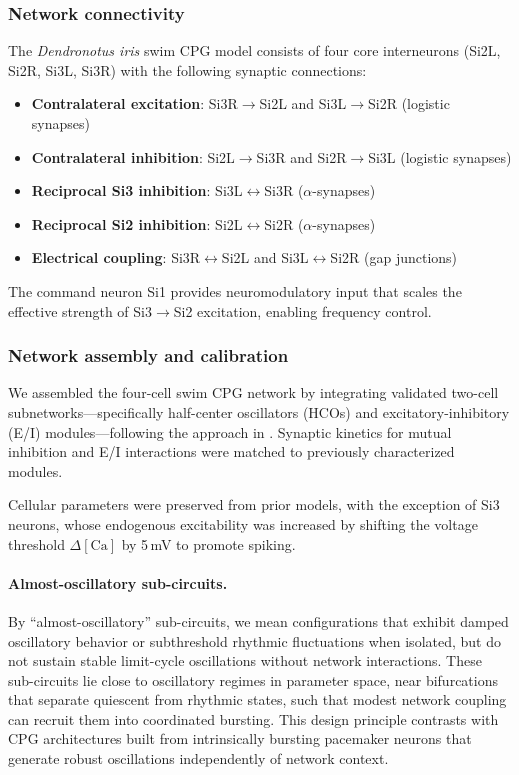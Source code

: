 \subsubsection*{Network connectivity}

The \textit{Dendronotus iris} swim CPG model consists of four core interneurons (Si2L, Si2R, Si3L, Si3R) with the following synaptic connections:
\begin{itemize}
    \item \textbf{Contralateral excitation}: Si3R$\to$Si2L and Si3L$\to$Si2R (logistic synapses)
    \item \textbf{Contralateral inhibition}: Si2L$\to$Si3R and Si2R$\to$Si3L (logistic synapses)
    \item \textbf{Reciprocal Si3 inhibition}: Si3L$\longleftrightarrow$Si3R ($\alpha$-synapses)
    \item \textbf{Reciprocal Si2 inhibition}: Si2L$\longleftrightarrow$Si2R ($\alpha$-synapses)
    \item \textbf{Electrical coupling}: Si3R$\longleftrightarrow$Si2L and Si3L$\longleftrightarrow$Si2R (gap junctions)
\end{itemize}

The command neuron Si1 provides neuromodulatory input that scales the effective strength of Si3$\to$Si2 excitation, enabling frequency control.


\subsubsection*{Network assembly and calibration}

We assembled the four-cell swim CPG network by integrating validated two-cell subnetworks---specifically half-center oscillators (HCOs) and excitatory-inhibitory (E/I) modules---following the approach in \cite{scully2024pairing}.
Synaptic kinetics for mutual inhibition and E/I interactions were matched to previously characterized modules.

Cellular parameters were preserved from prior models, with the exception of Si3 neurons, whose endogenous excitability was increased by shifting the voltage threshold $\Delta[\text{Ca}]$ by 5\,mV to promote spiking.

\paragraph{Almost-oscillatory sub-circuits.}
By ``almost-oscillatory'' sub-circuits, we mean configurations that exhibit damped oscillatory behavior or subthreshold rhythmic fluctuations when isolated, but do not sustain stable limit-cycle oscillations without network interactions.
These sub-circuits lie close to oscillatory regimes in parameter space, near bifurcations that separate quiescent from rhythmic states, such that modest network coupling can recruit them into coordinated bursting.
This design principle contrasts with CPG architectures built from intrinsically bursting pacemaker neurons that generate robust oscillations independently of network context.

